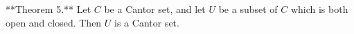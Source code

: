 **Theorem 5.** Let $C$ be a Cantor set, and let $U$ be a subset of $C$ which is both open and closed. Then $U$ is a Cantor set.
